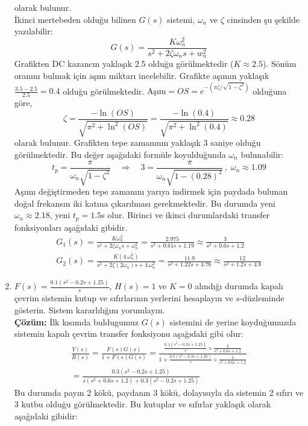\documentclass[a4paper,11pt]{article}
\begin{document}
\begin{enumerate}[label=\textbf{\alph*}{.}, leftmargin=\parindent]
    olarak bulunur.\\[1em]
    İkinci mertebeden olduğu bilinen $G(s)$ sistemi, $\omega_n$ ve $\zeta$ cinsinden şu şekilde yazılabilir:
    \[ G(s) = \frac{K \omega_n^2}{s^2 + 2\zeta\omega_n s + w_n^2}\]
    Grafikten DC kazancın yaklaşık 2.5 olduğu görülmektedir ($K \approx 2.5$). Sönüm oranını bulmak için aşım miktarı incelebilir. Grafikte aşımın yaklaşık $\frac{3.5 - 2.5}{2.5} = 0.4$ olduğu görülmektedir. $ \text{Aşım} = OS = e^{-(\pi\zeta / \sqrt{1-\zeta^2})} $ olduğuna göre,
    \[ \zeta = \frac{-\ln{(OS)}}{\sqrt{\pi^2 + \ln^2{(OS)}}} = \frac{-\ln{(0.4)}}{\sqrt{\pi^2 + \ln^2{(0.4)}}} \approx 0.28\]
    olarak bulunur. Grafikten tepe zamanının yaklaşık 3 saniye olduğu görülmektedir. Bu değer aşağıdaki formüle koyulduğunda $\omega_n$ bulunabilir:
    \[ t_p = \frac{\pi}{\omega_n\sqrt{1-\zeta^2}} \quad\Rightarrow\quad 3 = \frac{\pi}{\omega_n\sqrt{1 - (0.28)^2}} \,,\; \omega_n \approx 1.09 \]
    Aşımı değiştirmeden tepe zamanını yarıya indirmek için paydada bulunan doğal frekansın iki katına çıkarılması gerekmektedir. Bu durumda yeni $\omega_n \approx 2.18$, yeni $t_p = 1.5$s olur. Birinci ve ikinci durumlardaki transfer fonksiyonları aşağıdaki gibidir.
\begin{gather*}
    G_1(s) = \frac{K\omega_n^2}{s^2 + 2\zeta\omega_n s + \omega_n^2} = \frac{2.975}{s^2 + 0.61s + 1.19} \approx \frac{3}{s^2 + 0.6s + 1.2} \\[0.8em]
    G_2(s) = \frac{K(4\,\omega_n^2)}{s^2 + 2\zeta(2\omega_n) s + 4\,\omega_n^2} = \frac{11.9}{s^2 + 1.22s + 4.76} \approx \frac{12}{s^2 + 1.2s + 4.8}
\end{gather*}
    \newpage\item $F(s) = \frac{0.1(s^2 - 0.2s + 1.25)}{s}$, $H(s) = 1$ ve $K = 0$ alındığı durumda kapalı çevrim sistemin kutup ve sıfırlarının yerlerini hesaplayın ve $s$-düzleminde gösterin. Sistem kararlılığını yorumlayın.\\[1em]
    \textbf{Çözüm:} İlk kısımda buldugumuz $G(s)$ sistemini de yerine koyduğumuzda sistemin kapalı çevrim transfer fonksiyonu aşağıdaki gibi olur:
    \begin{gather*}
        \frac{Y(s)}{R(s)} = \frac{F(s)G(s)}{1 + F(s)G(s)} = \frac{\frac{0.1(s^2 - 0.2s + 1.25)}{s} \times \frac{3}{s^2 + 0.6s + 1.2}}{1 + \frac{0.1(s^2 - 0.2s + 1.25)}{s} \times \frac{3}{s^2 + 0.6s + 1.2}}  \\[1em]
        = \frac{0.3 (s^2 - 0.2s + 1.25)}{s(s^2 + 0.6s + 1.2) + 0.3 (s^2 - 0.2s + 1.25)}
    \end{gather*}
    Bu durumda payın 2 kökü, paydanın 3 kökü, dolayısıyla da sistemin 2 sıfırı ve 3 kutbu olduğu görülmektedir. Bu kutuplar ve sıfırlar yaklaşık olarak aşağıdaki gibidir:


\end{enumerate}
\end{document}
